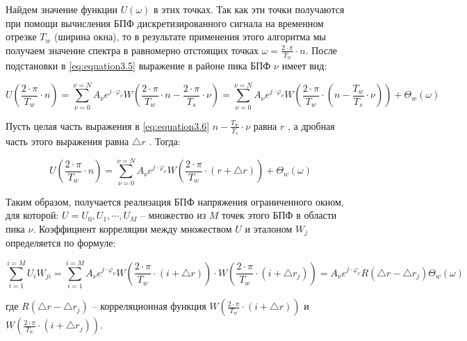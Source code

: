 Найдем значение функции $U(\omega)$  в этих точках. Так как эти точки получаются при помощи вычисления БПФ дискретизированного сигнала на временном отрезке $T_w$ (ширина окна), то в результате применения этого алгоритма мы получаем значение спектра в равномерно отстоящих точках $ \omega = \frac{2 \cdot \pi}{T_w} \cdot n$. После подстановки   в \ref{eq:equation3.5} выражение в районе пика БПФ $\nu$ имеет вид:

\begin{equation}
	\label{eq:equation3.6}
	U \left(\frac{2 \cdot \pi}{T_w} \cdot n \right) = \displaystyle\sum_{\nu=0}^{\nu=N} A_{\nu} e^{j \cdot \varphi_\nu} W\left( {\frac{2 \cdot \pi}{T_w} \cdot n - \frac{2 \cdot \pi}{T_s} \cdot \nu }\right) = \displaystyle\sum_{\nu=0}^{\nu=N} A_{\nu} e^{j \cdot \varphi_\nu} W \left({\frac{2 \cdot \pi}{T_w} \cdot \left( {n - \frac{T_w}{T_s} \cdot \nu} \right) } \right) + \Theta_w(\omega)
\end{equation}

Пусть целая часть выражения в \ref{eq:equation3.6} $ n - \frac{T_w}{T_s} \cdot \nu$  равна $r$ , а дробная часть этого выражения равна $ \bigtriangleup r$ . Тогда: 

\begin{equation}
	\label{eq:equation3.7}
	U \left(\frac{2 \cdot \pi}{T_w} \cdot n \right) = \displaystyle\sum_{\nu=0}^{\nu=N} A_{\nu} e^{j \cdot \varphi_\nu} W\left( {\frac{2 \cdot \pi}{T_w} \cdot (r + \bigtriangleup r ) }\right) + \Theta_w(\omega)
\end{equation}

Таким образом, получается реализация БПФ напряжения ограниченного окном, для которой: $U = {U_0, U_1, \cdots , U_M} $ – множество из $M$ точек этого БПФ в области пика $\nu$.
Коэффициент корреляции между множеством $U$ и эталоном $W_j$ определяется по формуле:

\begin{equation}
	\label{eq:equation3.8}
	\displaystyle\sum_{i=1}^{i=M} U_i W_{ji} = \displaystyle\sum_{i=1}^{i=M} A_{\nu} e^{j \cdot \varphi_\nu} W\left( {\frac{2 \cdot \pi}{T_w} \cdot (i + \bigtriangleup r ) }\right) \cdot W\left( {\frac{2 \cdot \pi}{T_w} \cdot (i + \bigtriangleup r_j ) }\right) = A_{\nu} e^{j \cdot \varphi_\nu} R (\bigtriangleup r - \bigtriangleup r_j) \Theta_w(\omega)
\end{equation}

где $R (\bigtriangleup r - \bigtriangleup r_j)$ – корреляционная функция $W\left( {\frac{2 \cdot \pi}{T_w} \cdot (i + \bigtriangleup r) }\right)$  и $W\left( {\frac{2 \cdot \pi}{T_w} \cdot (i + \bigtriangleup r_j) }\right)$. 

